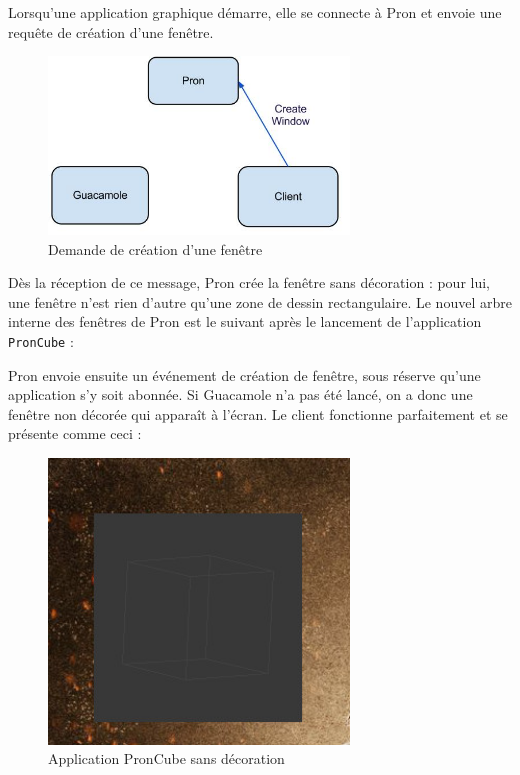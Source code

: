 Lorsqu'une application graphique démarre, elle se connecte à Pron et envoie une requête de création d'une fenêtre.

\begin{figure}[H]
  \centering
  \includegraphics[width=8cm]{images/Guacamole_anim_2.jpg}
  \caption{Demande de création d'une fenêtre}
  \label{fig:guacamole_anim_2}
\end{figure}

Dès la réception de ce message, Pron crée la fenêtre sans décoration : pour lui, une fenêtre n'est rien d'autre qu'une zone de dessin rectangulaire.
Le nouvel arbre interne des fenêtres de Pron est le suivant après le lancement de l'application \verb|PronCube| :

\begin{center}
\end{center}

Pron envoie ensuite un événement de création de fenêtre, sous réserve qu'une application s'y soit abonnée.
Si Guacamole n'a pas été lancé, on a donc une fenêtre non décorée qui apparaît à l'écran.
Le client fonctionne parfaitement et se présente comme ceci :

\begin{figure}[H]
  \centering
  \includegraphics[width=8cm]{images/pron_cube_sans_decoration.jpg}
  \caption{Application PronCube sans décoration}
  \label{fig:pron_cube_sans_decoration}
\end{figure}

